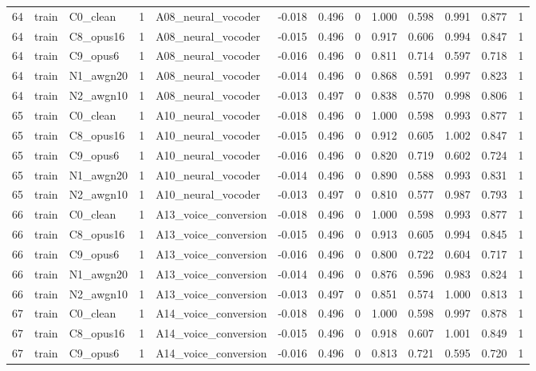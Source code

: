 \begin{tabular}{rllrlrrrrrrrr}
64 & train & C0_clean & 1 & A08_neural_vocoder & -0.018 & 0.496 & 0 & 1.000 & 0.598 & 0.991 & 0.877 & 1 \\
64 & train & C8_opus16 & 1 & A08_neural_vocoder & -0.015 & 0.496 & 0 & 0.917 & 0.606 & 0.994 & 0.847 & 1 \\
64 & train & C9_opus6 & 1 & A08_neural_vocoder & -0.016 & 0.496 & 0 & 0.811 & 0.714 & 0.597 & 0.718 & 1 \\
64 & train & N1_awgn20 & 1 & A08_neural_vocoder & -0.014 & 0.496 & 0 & 0.868 & 0.591 & 0.997 & 0.823 & 1 \\
64 & train & N2_awgn10 & 1 & A08_neural_vocoder & -0.013 & 0.497 & 0 & 0.838 & 0.570 & 0.998 & 0.806 & 1 \\
65 & train & C0_clean & 1 & A10_neural_vocoder & -0.018 & 0.496 & 0 & 1.000 & 0.598 & 0.993 & 0.877 & 1 \\
65 & train & C8_opus16 & 1 & A10_neural_vocoder & -0.015 & 0.496 & 0 & 0.912 & 0.605 & 1.002 & 0.847 & 1 \\
65 & train & C9_opus6 & 1 & A10_neural_vocoder & -0.016 & 0.496 & 0 & 0.820 & 0.719 & 0.602 & 0.724 & 1 \\
65 & train & N1_awgn20 & 1 & A10_neural_vocoder & -0.014 & 0.496 & 0 & 0.890 & 0.588 & 0.993 & 0.831 & 1 \\
65 & train & N2_awgn10 & 1 & A10_neural_vocoder & -0.013 & 0.497 & 0 & 0.810 & 0.577 & 0.987 & 0.793 & 1 \\
66 & train & C0_clean & 1 & A13_voice_conversion & -0.018 & 0.496 & 0 & 1.000 & 0.598 & 0.993 & 0.877 & 1 \\
66 & train & C8_opus16 & 1 & A13_voice_conversion & -0.015 & 0.496 & 0 & 0.913 & 0.605 & 0.994 & 0.845 & 1 \\
66 & train & C9_opus6 & 1 & A13_voice_conversion & -0.016 & 0.496 & 0 & 0.800 & 0.722 & 0.604 & 0.717 & 1 \\
66 & train & N1_awgn20 & 1 & A13_voice_conversion & -0.014 & 0.496 & 0 & 0.876 & 0.596 & 0.983 & 0.824 & 1 \\
66 & train & N2_awgn10 & 1 & A13_voice_conversion & -0.013 & 0.497 & 0 & 0.851 & 0.574 & 1.000 & 0.813 & 1 \\
67 & train & C0_clean & 1 & A14_voice_conversion & -0.018 & 0.496 & 0 & 1.000 & 0.598 & 0.997 & 0.878 & 1 \\
67 & train & C8_opus16 & 1 & A14_voice_conversion & -0.015 & 0.496 & 0 & 0.918 & 0.607 & 1.001 & 0.849 & 1 \\
67 & train & C9_opus6 & 1 & A14_voice_conversion & -0.016 & 0.496 & 0 & 0.813 & 0.721 & 0.595 & 0.720 & 1 \\

\end{tabular}
